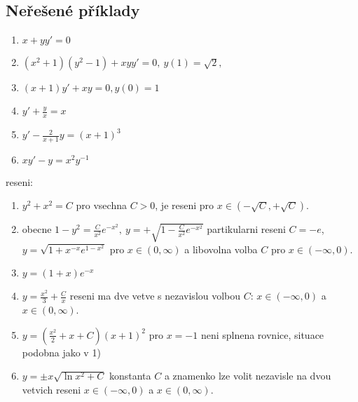 \subsection*{Neřešené příklady}
\begin{enumerate}
  \item 
    $ x+yy'=0 $
  \item 
    $ (x^2 +1)(y^2-1)+ xyy'=0,\ y(1)=\sqrt{2},$
  \item
    $ (x+1)y'+xy=0, y(0)=1$
  \item
    $y'+\frac{y}{x}=x$
  \item
    $y'-\frac{2}{x+1}y=(x+1)^3$
  \item
    $xy'-y=x^2 y^{-1}$
\end{enumerate}
reseni:
\begin{enumerate}
  \item
    $y^2+x^2=C$
    pro vsechna $C>0$, je reseni pro $x\in(-\sqrt C,+\sqrt C)$.
  \item
    obecne
    $ 1-y^2=\frac{C}{x^2}e^{-x^2},\ y=+\sqrt{1-\frac{C}{x^2} e^{-x^2}} $
    partikularni reseni $C=-e$,
    $y=\sqrt{1+x^{-x}e^{1-x^2}}$
     pro $x\in(0,\infty)$ a libovolna volba $C$ pro $x\in(-\infty,0)$.
  \item  
    $y=(1+x)e^{-x}$
  \item
    $y=\frac{x^2}{3}+\frac{C}{x}$
    reseni ma dve vetve s nezavislou volbou $C$: $x\in(-\infty,0)$ a $x\in(0,\infty)$.
  \item
    $y=(\frac{x^2}{2}+x+C)(x+1)^2$
    pro $x=-1$ neni splnena rovnice, situace podobna jako v 1)
  \item
    $y=\pm x\sqrt{\ln x^2+C}$
    konstanta $C$ a znamenko lze volit nezavisle na dvou vetvich reseni
    $x\in (-\infty,0)$ a $x\in (0,\infty)$.
\end{enumerate}
